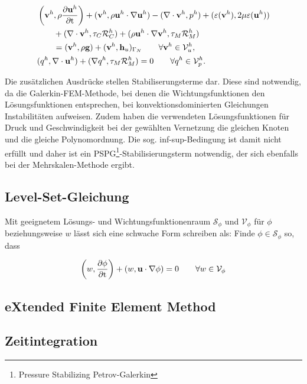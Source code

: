 \begin{align}
 &\left(\mathbf{v}^h,\rho\frac{\partial \mathbf{u}^h}{\partial \mathrm{t}}\right) + (\mathbf{v}^h,\rho\mathbf{u}^h\cdot\nabla\mathbf{u}^h)-(\nabla\cdot\mathbf{v}^h,p^h)+(\varepsilon(\mathbf{v}^h),2\mu\varepsilon(\mathbf{u}^h))\nonumber\\
&\qquad+(\nabla\cdot\mathbf{v}^h,\tau_C\mathcal{R}^h_C)+(\rho\mathbf{u}^h\cdot\nabla\mathbf{v}^h,\tau_M\mathcal{R}^h_M)  \nonumber\\
 &\qquad= (\mathbf{v}^h,\rho\mathbf{g})+(\mathbf{v}^h,\mathbf{h}_u)_{\Gamma_N} \qquad \forall\mathbf{v}^h \in \mathcal{V}^h_u,\\
&(q^h,\nabla\cdot\mathbf{u}^h)+(\nabla q^h,\tau_M\mathcal{R}^h_M) = 0 \qquad \forall q^h \in \mathcal{V}^h_p.
\end{align}

Die zusätzlichen Ausdrücke stellen Stabiliserungsterme dar. Diese sind notwendig, da die Galerkin-FEM-Methode, bei denen die Wichtungsfunktionen den Lösungsfunktionen entsprechen, bei konvektionsdominierten Gleichungen Instabilitäten aufweisen. Zudem haben die verwendeten Lösungsfunktionen für Druck und Geschwindigkeit bei der gewählten Vernetzung die gleichen Knoten und die gleiche Polynomordnung. Die sog. inf-sup-Bedingung ist damit nicht erfüllt und daher ist ein PSPG\footnote{Pressure Stabilizing Petrov-Galerkin}-Stabilisierungsterm notwendig, der sich ebenfalls bei der Mehrskalen-Methode ergibt.

\subsection{Level-Set-Gleichung}
Mit geeignetem Lösungs- und Wichtungsfunktionenraum $\mathcal{S}_\phi$ und $\mathcal{V}_\phi$ für $\phi$ beziehungsweise $w$ lässt sich eine schwache Form schreiben als: Finde $\phi \in \mathcal{S}_\phi$ so, dass

\begin{equation}
\left(w,\frac{\partial \phi}{\partial \mathrm{t}}\right) + (w,\mathbf{u}\cdot\nabla\phi) = 0 \qquad \forall w \in \mathcal{V}_\phi
\end{equation}

\subsection{eXtended Finite Element Method}
\label{sec:xfem}
\subsection{Zeitintegration}

